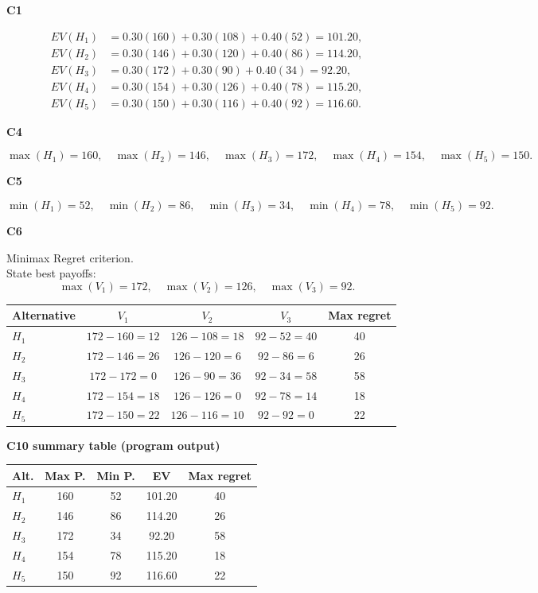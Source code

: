 \begin{ExamProblems}
		\textbf{C1}\par
				\[
		\begin{aligned}
			EV(H_1)&=0.30(160)+0.30(108)+0.40(52)=101.20,\\
			EV(H_2)&=0.30(146)+0.30(120)+0.40(86)=114.20,\\
			EV(H_3)&=0.30(172)+0.30(90)+0.40(34)=92.20,\\
			EV(H_4)&=0.30(154)+0.30(126)+0.40(78)=115.20,\\
			EV(H_5)&=0.30(150)+0.30(116)+0.40(92)=116.60.
		\end{aligned}
		\]
		

		\textbf{C4}\par
				\[
		\max(H_1)=160,\quad \max(H_2)=146,\quad \max(H_3)=172,\quad \max(H_4)=154,\quad \max(H_5)=150.
		\]
		

		\textbf{C5}\par
				\[
		\min(H_1)=52,\quad \min(H_2)=86,\quad \min(H_3)=34,\quad \min(H_4)=78,\quad \min(H_5)=92.
		\]
		


		\textbf{C6}\par
		Minimax Regret criterion.\\
				State best payoffs:
		\[
		\max(V_1)=172,\quad \max(V_2)=126,\quad \max(V_3)=92.
		\]
		\begin{center}
			\begin{tabular}{l c c c c}
				\toprule
				Alternative & $V_1$ & $V_2$ & $V_3$ & Max regret \\
				\midrule
				$H_1$ & $172-160=12$ & $126-108=18$ & $92-52=40$ & 40 \\
				$H_2$ & $172-146=26$ & $126-120=6$ & $92-86=6$ & 26 \\
				$H_3$ & $172-172=0$ & $126-90=36$ & $92-34=58$ & 58 \\
				$H_4$ & $172-154=18$ & $126-126=0$ & $92-78=14$ & 18 \\
				$H_5$ & $172-150=22$ & $126-116=10$ & $92-92=0$ & 22 \\
				\bottomrule
			\end{tabular}
		\end{center}
		

		\textbf{C10 summary table (program output)}\par
		\begin{center}
			\begin{tabular}{l c c c c}
				\hline
				Alt. & Max P. & Min P. & EV & Max regret \\
				\hline
				$H_1$ & 160 & 52 & 101.20 & 40 \\
				$H_2$ & 146 & 86 & 114.20 & 26 \\
				$H_3$ & 172 & 34 & 92.20 & 58 \\
				$H_4$ & 154 & 78 & 115.20 & 18 \\
				$H_5$ & 150 & 92 & 116.60 & 22 \\
				\hline
			\end{tabular}
		\end{center}
		

\end{ExamProblems}
